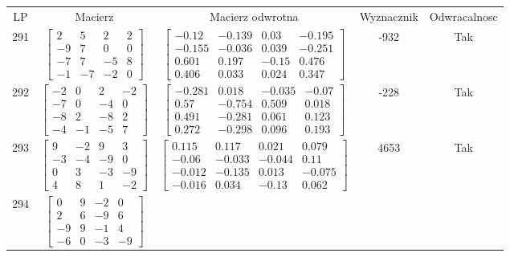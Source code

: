 \documentclass[a4paper,12pt]{article}
\begin{document}
\bgroup {} \vspace{0.2in} \begin{tabular}{c c c c c}
LP & Macierz & Macierz odwrotna & Wyznacznik & Odwracalnosc\\
291
&
$\begin{bmatrix} 2 & 5 & 2 & 2 \\ -9 & 7 & 0 & 0 \\ -7 & 7 & -5 & 8 \\ -1 & -7 & -2 & 0 \end{bmatrix}$
&
$\begin{bmatrix} -0.12 & -0.139 & 0.03 & -0.195 \\ -0.155 & -0.036 & 0.039 & -0.251 \\ 0.601 & 0.197 & -0.15 & 0.476 \\ 0.406 & 0.033 & 0.024 & 0.347 \end{bmatrix}$
&
-932
&
Tak
\\
292
&
$\begin{bmatrix} -2 & 0 & 2 & -2 \\ -7 & 0 & -4 & 0 \\ -8 & 2 & -8 & 2 \\ -4 & -1 & -5 & 7 \end{bmatrix}$
&
$\begin{bmatrix} -0.281 & 0.018 & -0.035 & -0.07 \\ 0.57 & -0.754 & 0.509 & 0.018 \\ 0.491 & -0.281 & 0.061 & 0.123 \\ 0.272 & -0.298 & 0.096 & 0.193 \end{bmatrix}$
&
-228
&
Tak
\\
293
&
$\begin{bmatrix} 9 & -2 & 9 & 3 \\ -3 & -4 & -9 & 0 \\ 0 & 3 & -3 & -9 \\ 4 & 8 & 1 & -2 \end{bmatrix}$
&
$\begin{bmatrix} 0.115 & 0.117 & 0.021 & 0.079 \\ -0.06 & -0.033 & -0.044 & 0.11 \\ -0.012 & -0.135 & 0.013 & -0.075 \\ -0.016 & 0.034 & -0.13 & 0.062 \end{bmatrix}$
&
4653
&
Tak
\\
294
&
$\begin{bmatrix} 0 & 9 & -2 & 0 \\ 2 & 6 & -9 & 6 \\ -9 & 9 & -1 & 4 \\ -6 & 0 & -3 & -9 \end{bmatrix}$

\end{tabular}
\end{document}
